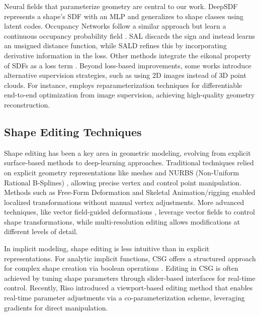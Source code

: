 Neural fields that parameterize geometry are central to our work. DeepSDF \cite{park2019deepsdf} represents a shape’s SDF with an MLP and generalizes to shape classes using latent codes. Occupancy Networks follow a similar approach but learn a continuous occupancy probability field \cite{mescheder2019occupancy}. SAL \cite{atzmon2020sal} discards the sign and instead learns an unsigned distance function, while SALD \cite{atzmon2020sald} refines this by incorporating derivative information in the loss. Other methods integrate the eikonal property of SDFs as a loss term \cite{yang2024stabilizing}. Beyond loss-based improvements, some works introduce alternative supervision strategies, such as using 2D images instead of 3D point clouds. For instance, \cite{bangaru2022differentiable} employs reparameterization techniques for differentiable end-to-end optimization from image supervision, achieving high-quality geometry reconstruction.

\subsection{Shape Editing Techniques}
Shape editing has been a key area in geometric modeling, evolving from explicit surface-based methods to deep-learning approaches. Traditional techniques relied on explicit geometry representations like meshes and NURBS (Non-Uniform Rational B-Splines) \cite{versprille1975computer}, allowing precise vertex and control point manipulation. Methods such as Free-Form Deformation \cite{sederberg1986free} and Skeletal Animation/rigging enabled localized transformations without manual vertex adjustments. More advanced techniques, like vector field-guided deformations \cite{von2006vector}, leverage vector fields to control shape transformations, while multi-resolution editing \cite{zorin1997interactive} allows modifications at different levels of detail.

In implicit modeling, shape editing is less intuitive than in explicit representations. For analytic implicit functions, CSG offers a structured approach for complex shape creation via boolean operations \cite{requicha1985boolean}. Editing in CSG is often achieved by tuning shape parameters through slider-based interfaces for real-time control. Recently, Riso \etal \cite{riso24direct} introduced a viewport-based editing method that enables real-time parameter adjustments via a co-parameterization scheme, leveraging gradients for direct manipulation.

